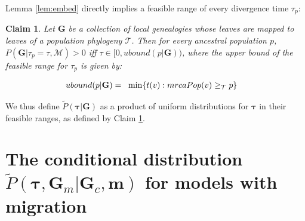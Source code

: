 \documentclass[11pt]{article}
\newcommand{\vect}[1]{\boldsymbol{\mathbf{#1}}}
\newcommand{\M}{\mathcal{M}}
\newcommand{\Tr}{\mathcal{T}}
\newcommand{\G}{\vect{G}}
\newcommand{\Pref}{\widetilde{P}}
\newcommand{\1}{\mathbbm{1}}
\newcommand{\Gc}{\G_c}
\newcommand{\Gm}{\G_m}
\newtheorem{claim}{Claim}
\newcommand{\taus}{\vect\tau}
\newcommand{\migs}{\vect{m}}
\begin{document}
Lemma \ref{lem:embed} directly implies a feasible range of every divergence time $\tau_p$:

\begin{claim}\label{claim:tau_bound_nomig}
 Let $\G$ be a  collection of local genealogies whose leaves are mapped to leaves of a population phylogeny $\Tr$.
 Then for every ancestral population $p$, $P(\G|\tau_p=\tau,\M)>0$ iff $\tau \in [0 , ubound(p|\G) )$, where the upper bound of the feasible range for $\tau_p$
 is given by:
 \begin{small}
 \begin{align}
  ubound(p|\G)   =~~ & \min \{t(v):mrcaPop(v)\anc p\} \label{eq:ubound_nomig}  %
 \end{align}
 \end{small}
\end{claim}

We thus define $\Pref(\taus|\G)$ as a product of uniform distributions for $\taus$ in their feasible ranges, as defined by Claim \ref{claim:tau_bound_nomig}.

\section{\texorpdfstring{The conditional distribution  $\Pref(\taus,\Gm|\Gc,\migs)$ for models with migration}{Conditional distribution with migration}}\label{ap:cond_mig}
\end{document}
